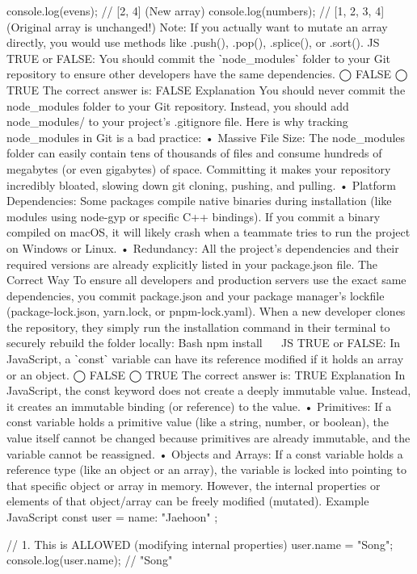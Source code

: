 console.log(evens);   // [2, 4] (New array)
console.log(numbers); // [1, 2, 3, 4] (Original array is unchanged!)
Note: If you actually want to mutate an array directly, you would use methods like .push(), .pop(), .splice(), or .sort().
JS
TRUE or FALSE: You should commit the ˋnode_modulesˋ folder to your Git repository to ensure other developers have the same dependencies.
◯ FALSE
◯ TRUE
The correct answer is:
FALSE
Explanation
You should never commit the node_modules folder to your Git repository. Instead, you should add node_modules/ to your project's .gitignore file.
Here is why tracking node_modules in Git is a bad practice:
•	Massive File Size: The node_modules folder can easily contain tens of thousands of files and consume hundreds of megabytes (or even gigabytes) of space. Committing it makes your repository incredibly bloated, slowing down git cloning, pushing, and pulling.
•	Platform Dependencies: Some packages compile native binaries during installation (like modules using node-gyp or specific C++ bindings). If you commit a binary compiled on macOS, it will likely crash when a teammate tries to run the project on Windows or Linux.
•	Redundancy: All the project's dependencies and their required versions are already explicitly listed in your package.json file.
The Correct Way
To ensure all developers and production servers use the exact same dependencies, you commit package.json and your package manager's lockfile (package-lock.json, yarn.lock, or pnpm-lock.yaml).
When a new developer clones the repository, they simply run the installation command in their terminal to securely rebuild the folder locally:
Bash
npm install
 
JS
TRUE or FALSE: In JavaScript, a ˋconstˋ variable can have its reference modified if it holds an array or an object.
◯ FALSE
◯ TRUE
The correct answer is:
TRUE
Explanation
In JavaScript, the const keyword does not create a deeply immutable value. Instead, it creates an immutable binding (or reference) to the value.
•	Primitives: If a const variable holds a primitive value (like a string, number, or boolean), the value itself cannot be changed because primitives are already immutable, and the variable cannot be reassigned.
•	Objects and Arrays: If a const variable holds a reference type (like an object or an array), the variable is locked into pointing to that specific object or array in memory. However, the internal properties or elements of that object/array can be freely modified (mutated).
Example
JavaScript
const user = { name: "Jaehoon" };

// 1. This is ALLOWED (modifying internal properties)
user.name = "Song"; 
console.log(user.name); // "Song"

